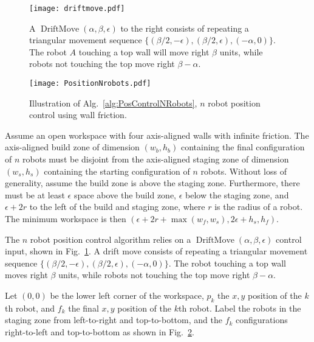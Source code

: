 \begin{figure}
\begin{center}
	\texttt{[image: driftmove.pdf]}
\end{center}
\caption{\label{fig:driftmove}
A  $\operatorname{DriftMove}(\alpha, \beta, \epsilon)$ to the right consists of repeating a triangular movement sequence $\{ (\beta/2,-\epsilon),(\beta/2,\epsilon),(-\alpha,0)\}$. The robot $A$ touching a top wall will move right $\beta$ units, while robots not touching the top move right $\beta-\alpha$.
}
\end{figure}
\begin{figure}
\begin{center}
	\texttt{[image: PositionNrobots.pdf]}
\end{center}
\caption{\label{fig:construction2d}
Illustration of Alg.\ \ref{alg:PosControlNRobots}, $n$ robot position control  using wall friction.
}
\end{figure}


Assume an open workspace with four axis-aligned walls with infinite friction.
The axis-aligned build zone of dimension $(w_b, h_b)$ containing the final configuration of $n$ robots must be disjoint from the axis-aligned staging zone of dimension $(w_s, h_s)$  containing the starting configuration of $n$ robots. Without loss of generality, assume the build zone  is above the staging zone. 
Furthermore, there must be at least $\epsilon$ space above the build zone, $\epsilon$ below the staging zone, and $\epsilon + 2r$ to the left of the build and staging zone, where $r$ is the radius of a robot.  The minimum workspace is then $(\epsilon + 2r + \max(w_f,w_s), 2\epsilon + h_s,h_f)$.

The $n$ robot position control algorithm relies on a $\operatorname{DriftMove}(\alpha, \beta, \epsilon)$ control input, shown in Fig.\  \ref{fig:driftmove}.
A drift move consists of repeating a triangular movement sequence $\{ (\beta/2,-\epsilon),(\beta/2,\epsilon),(-\alpha,0)\}$. The robot touching a top wall moves right $\beta$ units, while robots not touching the top move right $\beta-\alpha$.

Let $(0,0)$ be the lower left corner of the workspace, $p_k$ the $x,y$ position of the $k$th robot, and $f_k$ the final $x,y$ position of the $k$th robot. Label the robots in the staging zone from left-to-right and top-to-bottom, and the $f_k$ configurations right-to-left and top-to-bottom as shown in Fig.~\ref{fig:construction2d}.

